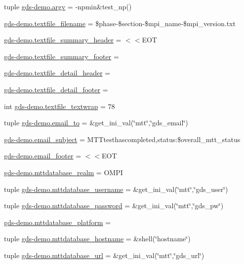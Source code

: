 \begin{DoxyCompactItemize}
tuple \hyperlink{namespacegds-demo_ac0172e0836a56b7aaec9bb9d5a697bcd}{gds-\/demo.\-argv} = -\/npmin\&test\-\_\-np()
\item 
\hyperlink{namespacegds-demo_a210b065329c1196c2b4205f4e4e8db53}{gds-\/demo.\-textfile\-\_\-filename} = \$phase-\/\$section-\/\$mpi\-\_\-name-\/\$mpi\-\_\-version.\-txt
\item 
\hyperlink{namespacegds-demo_a211b7a2e48808f11b61bcb2bae18d23f}{gds-\/demo.\-textfile\-\_\-summary\-\_\-header} = $<$$<$E\-O\-T
\item 
\hyperlink{namespacegds-demo_a7791b144751668f4a2bd3aabde7ec607}{gds-\/demo.\-textfile\-\_\-summary\-\_\-footer} =
\item 
\hyperlink{namespacegds-demo_a58b62d7de4b3e126d25d88e6cdb438cf}{gds-\/demo.\-textfile\-\_\-detail\-\_\-header} =
\item 
\hyperlink{namespacegds-demo_a7b2740aecad3e48a8252e41b8e4e0aac}{gds-\/demo.\-textfile\-\_\-detail\-\_\-footer} =
\item 
int \hyperlink{namespacegds-demo_aaaa191ed09a9a9150e323f1f49713812}{gds-\/demo.\-textfile\-\_\-textwrap} = 78
\item 
tuple \hyperlink{namespacegds-demo_a758502074a250507a71dd1afdd3cf50c}{gds-\/demo.\-email\-\_\-to} = \&get\-\_\-ini\-\_\-val(\char`\"{}mtt\char`\"{},\char`\"{}gds\-\_\-email\char`\"{})
\item 
\hyperlink{namespacegds-demo_a772ba8c6d51a7d3574b66d2dfd4194a5}{gds-\/demo.\-email\-\_\-subject} = M\-T\-Ttesthascompleted,status\-:\$overall\-\_\-mtt\-\_\-status
\item 
\hyperlink{namespacegds-demo_a131b88d6f8596699cad6b6501edee00e}{gds-\/demo.\-email\-\_\-footer} = $<$$<$E\-O\-T
\item 
\hyperlink{namespacegds-demo_af97c95f0978e6f297cd4893962369a06}{gds-\/demo.\-mttdatabase\-\_\-realm} = O\-M\-P\-I
\item 
tuple \hyperlink{namespacegds-demo_a74802c727b9ae23b038625a85efa3d73}{gds-\/demo.\-mttdatabase\-\_\-username} = \&get\-\_\-ini\-\_\-val(\char`\"{}mtt\char`\"{},\char`\"{}gds\-\_\-user\char`\"{})
\item 
tuple \hyperlink{namespacegds-demo_aa5503d77b2af640cee7a9cddf64d32af}{gds-\/demo.\-mttdatabase\-\_\-password} = \&get\-\_\-ini\-\_\-val(\char`\"{}mtt\char`\"{},\char`\"{}gds\-\_\-pw\char`\"{})
\item 
\hyperlink{namespacegds-demo_a5b63d22833bd28b9d8409c376db882e4}{gds-\/demo.\-mttdatabase\-\_\-platform} =
\item 
tuple \hyperlink{namespacegds-demo_aa4de05678316043e454babc3bf6f66f8}{gds-\/demo.\-mttdatabase\-\_\-hostname} = \&shell(\char`\"{}hostname\char`\"{})
\item 
tuple \hyperlink{namespacegds-demo_ad067871dce5c5a51f34693d833b0e0ef}{gds-\/demo.\-mttdatabase\-\_\-url} = \&get\-\_\-ini\-\_\-val(\char`\"{}mtt\char`\"{},\char`\"{}gds\-\_\-url\char`\"{})
\end{DoxyCompactItemize}
